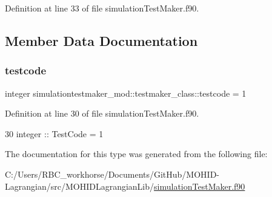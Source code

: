 Definition at line 33 of file simulation\+Test\+Maker.\+f90.



\subsection{Member Data Documentation}
\mbox{\label{structsimulationtestmaker__mod_1_1testmaker__class_a6a977035665b465b4392371a27acc350}} 
\subsubsection{\texorpdfstring{testcode}{testcode}}
{\footnotesize\ttfamily integer simulationtestmaker\+\_\+mod\+::testmaker\+\_\+class\+::testcode = 1\hspace{0.3cm}{\ttfamily [private]}}



Definition at line 30 of file simulation\+Test\+Maker.\+f90.


\begin{DoxyCode}
30         \textcolor{keywordtype}{integer} :: TestCode = 1
\end{DoxyCode}


The documentation for this type was generated from the following file\+:\begin{DoxyCompactItemize}
\item 
C\+:/\+Users/\+R\+B\+C\+\_\+workhorse/\+Documents/\+Git\+Hub/\+M\+O\+H\+I\+D-\/\+Lagrangian/src/\+M\+O\+H\+I\+D\+Lagrangian\+Lib/\mbox{\hyperlink{simulation_test_maker_8f90}{simulation\+Test\+Maker.\+f90}}\end{DoxyCompactItemize}
